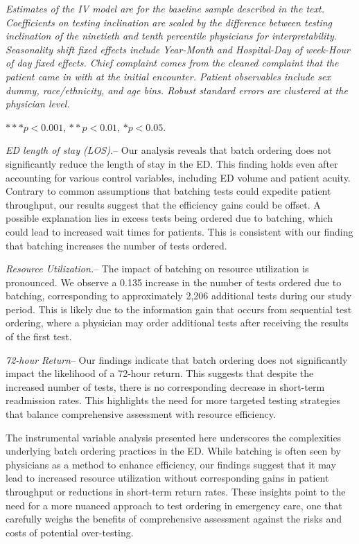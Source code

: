 \documentclass[,,nonblindrev]{informs}
\begin{document}
\begin{table}[!htbp]
\begin{tablenotes}
\tiny
\item \textit{Estimates of the IV model are for the baseline sample described in the text. Coefficients on testing inclination are scaled by the difference between testing inclination of the ninetieth and tenth percentile physicians for interpretability. Seasonality shift fixed effects include Year-Month and Hospital-Day of week-Hour of day fixed effects. Chief complaint comes from the cleaned complaint that the patient came in with at the initial encounter. Patient observables include sex dummy, race/ethnicity, and age bins. Robust standard errors are clustered at the physician level.}
\item $*** p < 0.001$, $** p < 0.01$, $* p < 0.05$.
\end{tablenotes}
\end{table}

\emph{ED length of stay (LOS).}-- Our analysis reveals that batch
ordering does not significantly reduce the length of stay in the ED.
This finding holds even after accounting for various control variables,
including ED volume and patient acuity. Contrary to common assumptions
that batching tests could expedite patient throughput, our results
suggest that the efficiency gains could be offset. A possible
explanation lies in excess tests being ordered due to batching, which
could lead to increased wait times for patients. This is consistent with
our finding that batching increases the number of tests ordered.

\emph{Resource Utilization.}-- The impact of batching on resource
utilization is pronounced. We observe a 0.135 increase in the number of
tests ordered due to batching, corresponding to approximately 2,206
additional tests during our study period. This is likely due to the
information gain that occurs from sequential test ordering, where a
physician may order additional tests after receiving the results of the
first test.

\emph{72-hour Return}-- Our findings indicate that batch ordering does
not significantly impact the likelihood of a 72-hour return. This
suggests that despite the increased number of tests, there is no
corresponding decrease in short-term readmission rates. This highlights
the need for more targeted testing strategies that balance comprehensive
assessment with resource efficiency.

The instrumental variable analysis presented here underscores the
complexities underlying batch ordering practices in the ED. While
batching is often seen by physicians as a method to enhance efficiency,
our findings suggest that it may lead to increased resource utilization
without corresponding gains in patient throughput or reductions in
short-term return rates. These insights point to the need for a more
nuanced approach to test ordering in emergency care, one that carefully
weighs the benefits of comprehensive assessment against the risks and
costs of potential over-testing.
\end{document}
